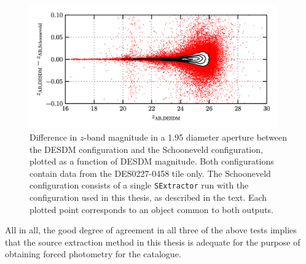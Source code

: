 \begin{figure}[h] 
\centering    
\includegraphics[width=0.95\textwidth]{z_flux_compare.png}
\caption[Verification of the photometry method: photometry]{Difference in $z$-band magnitude in a \SI{1.95}{\arcsec} diameter aperture between the DESDM configuration and the Schooneveld configuration, plotted as a function of DESDM magnitude. Both configurations contain data from the DES0227-0458 tile only. The Schooneveld configuration consists of a single \texttt{SExtractor} run with the \DESVIDEO configuration used in this thesis, as described in the text. Each plotted point corresponds to an object common to both outputs.}
\label{fig:z_flux_compare}
\end{figure}


All in all, the good degree of agreement in all three of the above tests implies that the source extraction method in this thesis is adequate for the purpose of obtaining forced photometry for the \DESVIDEO catalogue. \par 



